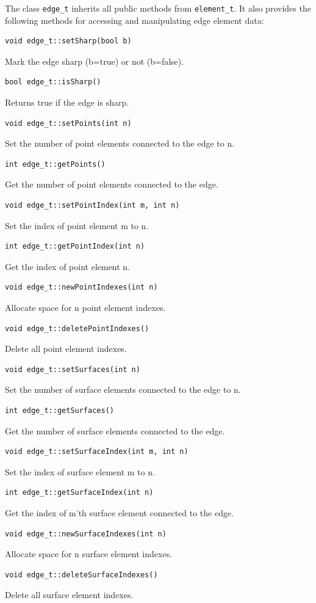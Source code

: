 The class {\tt edge\_t} inherits all public methods from {\tt element\_t}.
It also provides the following methods for accessing and manipulating edge
element data:
\begin{verbatim}
void edge_t::setSharp(bool b)
\end{verbatim}
Mark the edge sharp (b=true) or not (b=false).
\begin{verbatim}
bool edge_t::isSharp()
\end{verbatim}
Returns true if the edge is sharp.
\begin{verbatim} 
void edge_t::setPoints(int n)
\end{verbatim}
Set the number of point elements connected to the edge to n.
\begin{verbatim}
int edge_t::getPoints()
\end{verbatim}
Get the number of point elements connected to the edge.
\begin{verbatim}
void edge_t::setPointIndex(int m, int n)
\end{verbatim}
Set the index of point element m to n.
\begin{verbatim}
int edge_t::getPointIndex(int n)
\end{verbatim}
Get the index of point element n.
\begin{verbatim}
void edge_t::newPointIndexes(int n)
\end{verbatim}
Allocate space for n point element indexes.
\begin{verbatim}
void edge_t::deletePointIndexes()
\end{verbatim}
Delete all point element indexes.
\begin{verbatim}
void edge_t::setSurfaces(int n)
\end{verbatim}
Set the number of surface elements connected to the edge to n.
\begin{verbatim}
int edge_t::getSurfaces()
\end{verbatim}
Get the number of surface elements connected to the edge.
\begin{verbatim}
void edge_t::setSurfaceIndex(int m, int n)
\end{verbatim}
Set the index of surface element m to n.
\begin{verbatim}
int edge_t::getSurfaceIndex(int n)
\end{verbatim}
Get the index of m'th surface element connected to the edge.
\begin{verbatim}
void edge_t::newSurfaceIndexes(int n)
\end{verbatim}
Allocate space for n surface element indexes.
\begin{verbatim}
void edge_t::deleteSurfaceIndexes()
\end{verbatim}
Delete all surface element indexes.

